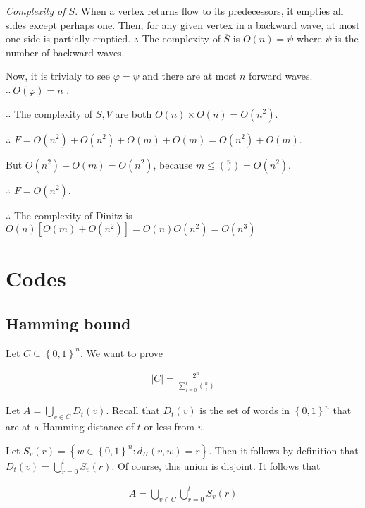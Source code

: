 \documentclass[a4paper]{article}
\begin{document}
\textit{Complexity of $\overline{S}$}. When a vertex returns flow 
to its predecessors, it empties all sides except perhaps 
one. Then, for any given vertex in a backward wave, 
at most one side is partially emptied. $\therefore $ The 
complexity of $\overline{S}$ is $O(n) = \psi$ where $\psi$ 
is the number of backward waves.

Now, it is trivialy to see $\varphi = \psi$ and there are 
at most $n$ forward waves. $\therefore ~ O(\varphi) = n$ . 

$\therefore $ The complexity of $\overline{S}, \overline{V}$ are both 
$O(n) \times O(n) = O(n^2)$.

$\therefore $ $F = O(n^2) + O(n^2) + O(m) + O(m) = O(n^2) + O(m)$.

But $O(n^2) + O(m) = O(n^2)$, because $m \leq \binom{n}{2} = O(n^2)$.

$\therefore $ $F = O(n^2)$.

$\therefore $ The complexity of Dinitz is $O(n) \left[ O(m) + O(n^2) \right] = O(n)O(n^2) = O(n^3) $





\pagebreak

\section{Codes}

\subsection{Hamming bound}

Let $C \subseteq \left\{ 0, 1 \right\}^{n} $. We want to prove 

\begin{align*}
    |C| = \frac{2^n}{\sum_{i=0}^{t} \binom{n}{i}}
\end{align*}

Let $A = \bigcup_{v \in C} D_t(v)$. Recall that $D_t(v)$ is the set of words in 
$\left\{ 0, 1 \right\}^n$ that are at a Hamming distance of $t$ or less from $v$.

Let $S_v(r) = \left\{ w \in \left\{ 0, 1 \right\}^n : d_H(v, w) = r  \right\}
$. Then it follows by definition that $D_t(v) = \bigcup_{r=0}^{t} S_v(r)$. Of course,
this union is disjoint. It follows that 

\begin{align*}
    A = \bigcup_{v \in C} \bigcup_{r = 0}^{t} S_v(r)
\end{align*}
\end{document}
